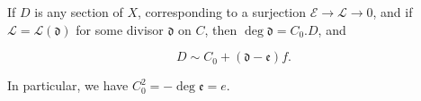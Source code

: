 If $D$ is any section of $X$, corresponding to a surjection $\mathcal{E} \rightarrow \mathcal{L} \rightarrow 0$, and if $\mathcal{L} = \mathcal{L}(\mathfrak{d})$ for some divisor $\mathfrak{d}$ on $C$, then $\deg \mathfrak{d} = C_0.D$, and

$$D \sim C_0 + (\mathfrak{d} - \mathfrak{e})f.$$

In particular, we have $C_0^2 = -\deg \mathfrak{e} = e$.
